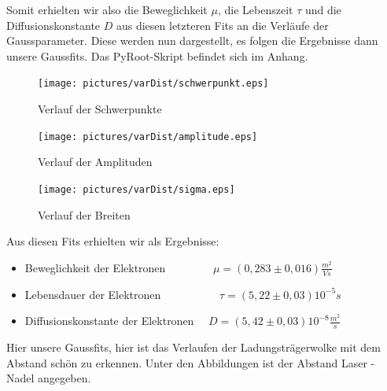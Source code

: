 \documentclass[12pt]{article}
\begin{document}
Somit erhielten wir also die Beweglichkeit $\mu$, die Lebenszeit $\tau$ und die Diffusionskonstante $D$ aus diesen letzteren Fits an die Verläufe der Gaussparameter. Diese werden nun dargestellt, es folgen die Ergebnisse dann unsere Gaussfits. Das PyRoot-Skript befindet sich im Anhang.


\begin{figure}[H]  
\texttt{[image: pictures/varDist/schwerpunkt.eps]}
\caption{Verlauf der Schwerpunkte}
\end{figure}

\begin{figure}[H]  
\texttt{[image: pictures/varDist/amplitude.eps]}
\caption{Verlauf der Amplituden}
\end{figure}

\begin{figure}[H]  
\texttt{[image: pictures/varDist/sigma.eps]}
\caption{Verlauf der Breiten}
\end{figure}

Aus diesen Fits erhielten wir als Ergebnisse:

\begin{itemize}
 \item Beweglichkeit der Elektronen ~~~~~~~~$\mu = (0,283 \pm 0,016) \frac{m^2}{Vs}$ 
 \item Lebensdauer der Elektronen ~~~~~~~~~~$\tau = (5,22 \pm 0,03) 10^{-5} s $
 \item Diffusionskonstante der Elektronen ~~$D = (5,42 \pm 0,03) 10^{-8} \frac{m^2}{s}$
\end{itemize}


\newpage
Hier unsere Gaussfits, hier ist das Verlaufen der Ladungsträgerwolke mit dem Abstand schön zu erkennen. Unter den Abbildungen ist der Abstand Laser - Nadel angegeben.
\end{document}
